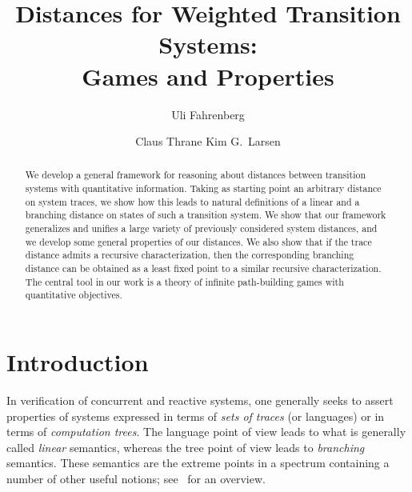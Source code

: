 \documentclass[copyright,creativecommons,sharealike]{eptcs}
\theoremstyle{plain}
\begin{document}
\title{Distances for Weighted Transition Systems: \\ Games and
  Properties}

\author{Uli Fahrenberg 
  \and
  Claus Thrane \qquad\qquad Kim G.~Larsen
 }

\def\titlerunning{Distances for Weighted Transition Systems}
\def\authorrunning{Fahrenberg, Thrane \& Larsen}

\maketitle

\begin{abstract}
  We develop a general framework for reasoning about distances between
  transition systems with quantitative information.  Taking as
  starting point an arbitrary distance on system traces, we show how
  this leads to natural definitions of a linear and a branching
  distance on states of such a transition system.  We show that our
  framework generalizes and unifies a large variety of previously
  considered system distances, and we develop some general properties
  of our distances.  We also show that if the trace distance admits a
  recursive characterization, then the corresponding branching
  distance can be obtained as a least fixed point to a similar
  recursive characterization.  The central tool in our work is a
  theory of infinite path-building games with quantitative objectives.
\end{abstract}

\section{Introduction}

In verification of concurrent and reactive systems, one generally
seeks to assert properties of systems expressed in terms of \emph{sets
  of traces} (or languages) or in terms of \emph{computation trees}.
The language point of view leads to what is generally called
\emph{linear} semantics, whereas the tree point of view leads to
\emph{branching} semantics.  These semantics are the extreme points in
a spectrum containing a number of other useful notions;
see~\cite{Glabbeek01-lbs} for an overview.
\end{document}
